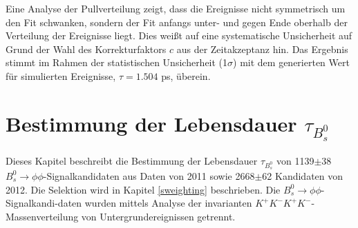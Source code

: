 \documentclass{article}
\begin{document}
Eine Analyse der Pullverteilung zeigt, dass die Ereignisse nicht symmetrisch um den Fit schwanken, sondern der Fit anfangs unter- und gegen Ende oberhalb der Verteilung der Ereignisse liegt. Dies weißt auf eine systematische Unsicherheit auf Grund der Wahl des Korrekturfaktors $c$ aus der Zeitakzeptanz hin.
Das Ergebnis stimmt im Rahmen der statistischen Unsicherheit (1$\sigma$) mit dem generierten Wert für simulierten Ereignisse, $\tau=1.504$ ps, überein.

%
%


\pagebreak
\section*{ }

\newpage
\section{Bestimmung der Lebensdauer $\tau_{B_s^0}$}%
Dieses Kapitel beschreibt die Bestimmung der Lebensdauer $\tau_{B_s^0}$ von 1139$\pm$38 $B_s^0 \rightarrow \phi\phi$-Signalkandidaten aus Daten von 2011 sowie 2668$\pm$62 Kandidaten von 2012. Die Selektion wird in Kapitel \ref{sweighting} beschrieben. Die $B_s^0 \rightarrow \phi\phi$-Signalkandi-daten wurden mittels Analyse der invarianten $K^+K^-K^+K^-$-Massenverteilung von Untergrundereignissen getrennt. 
\end{document}
